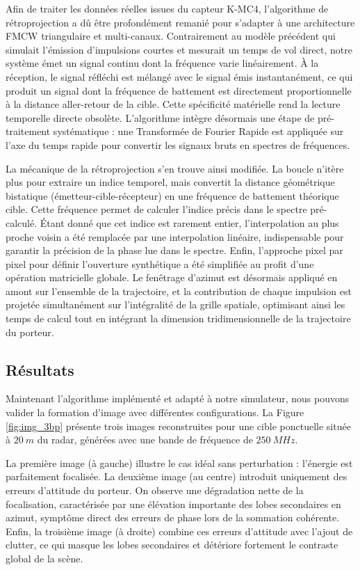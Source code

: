 Afin de traiter les données réelles issues du capteur K-MC4, l'algorithme de rétroprojection a dû être profondément remanié pour s'adapter à une architecture FMCW triangulaire et multi-canaux. Contrairement au modèle précédent qui simulait l'émission d'impulsions courtes et mesurait un temps de vol direct, notre système émet un signal continu dont la fréquence varie linéairement. À la réception, le signal réfléchi est mélangé avec le signal émis instantanément, ce qui produit un signal dont la fréquence de battement est directement proportionnelle à la distance aller-retour de la cible. Cette spécificité matérielle rend la lecture temporelle directe obsolète.  L'algorithme intègre désormais une étape de pré-traitement systématique : une Transformée de Fourier Rapide est appliquée sur l'axe du temps rapide pour convertir les signaux bruts en spectres de fréquences.

La mécanique de la rétroprojection s'en trouve ainsi modifiée. La boucle n'itère plus pour extraire un indice temporel, mais convertit la distance géométrique bistatique (émetteur-cible-récepteur) en une fréquence de battement théorique cible. Cette fréquence permet de calculer l'indice précis dans le spectre pré-calculé. Étant donné que cet indice est rarement entier, l'interpolation au plus proche voisin a été remplacée par une interpolation linéaire, indispensable pour garantir la précision de la phase lue dans le spectre. Enfin, l'approche pixel par pixel pour définir l'ouverture synthétique a été simplifiée au profit d'une opération matricielle globale. Le fenêtrage d'azimut est désormais appliqué en amont sur l'ensemble de la trajectoire, et la contribution de chaque impulsion est projetée simultanément sur l'intégralité de la grille spatiale, optimisant ainsi les temps de calcul tout en intégrant la dimension tridimensionnelle de la trajectoire du porteur.

\subsection{Résultats}

Maintenant l'algorithme implémenté et adapté à notre simulateur, nous pouvons valider la formation d'image avec différentes configurations. La Figure \ref{fig:img_3bp} présente trois images reconstruites pour une cible ponctuelle située à $20~m$ du radar, générées avec une bande de fréquence de $250~MHz$.

La première image (à gauche) illustre le cas idéal sans perturbation : l'énergie est parfaitement focalisée. La deuxième image (au centre) introduit uniquement des erreurs d'attitude du porteur. On observe une dégradation nette de la focalisation, caractérisée par une élévation importante des lobes secondaires en azimut, symptôme direct des erreurs de phase lors de la sommation cohérente. Enfin, la troisième image (à droite) combine ces erreurs d'attitude avec l'ajout de clutter, ce qui masque les lobes secondaires et détériore fortement le contraste global de la scène.

